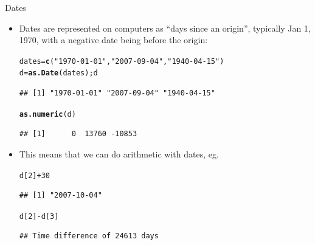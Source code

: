 \documentclass[unknownkeysallowed]{beamer}\usepackage[]{graphicx}\usepackage[]{color}
\makeatletter
\newcommand{\hlnum}[1]{\textcolor[rgb]{0.686,0.059,0.569}{#1}}%
\newcommand{\hlstr}[1]{\textcolor[rgb]{0.192,0.494,0.8}{#1}}%
\newcommand{\hlopt}[1]{\textcolor[rgb]{0,0,0}{#1}}%
\newcommand{\hlstd}[1]{\textcolor[rgb]{0.345,0.345,0.345}{#1}}%
\newcommand{\hlkwb}[1]{\textcolor[rgb]{0.69,0.353,0.396}{#1}}%
\newcommand{\hlkwd}[1]{\textcolor[rgb]{0.737,0.353,0.396}{\textbf{#1}}}%
\newenvironment{kframe}{%
 \def\at@end@of@kframe{}%
 \ifinner\ifhmode%
  \def\at@end@of@kframe{\end{minipage}}%
  \begin{minipage}{\columnwidth}%
 \fi\fi%
 \def\FrameCommand##1{\hskip\@totalleftmargin \hskip-\fboxsep
 \colorbox{shadecolor}{##1}\hskip-\fboxsep
     \hskip-\linewidth \hskip-\@totalleftmargin \hskip\columnwidth}%
 \MakeFramed {\advance\hsize-\width
   \@totalleftmargin\z@ \linewidth\hsize
   \@setminipage}}%
 {\par\unskip\endMakeFramed%
 \at@end@of@kframe}
\newenvironment{knitrout}{}{} %
\makeatother
\begin{document}
\begin{frame}[fragile]{Dates}
  
  \begin{itemize}
  \item Dates are represented on computers as ``days since an
    origin'', typically Jan 1, 1970, with a negative date  being
    before the origin: 
    
\begin{knitrout}
\color{fgcolor}\begin{kframe}
\begin{alltt}
\hlstd{dates}\hlkwb{=}\hlkwd{c}\hlstd{(}\hlstr{"1970-01-01"}\hlstd{,}\hlstr{"2007-09-04"}\hlstd{,}\hlstr{"1940-04-15"}\hlstd{)}
\hlstd{d}\hlkwb{=}\hlkwd{as.Date}\hlstd{(dates) ; d}
\end{alltt}
\begin{verbatim}
## [1] "1970-01-01" "2007-09-04" "1940-04-15"
\end{verbatim}
\begin{alltt}
\hlkwd{as.numeric}\hlstd{(d)}
\end{alltt}
\begin{verbatim}
## [1]      0  13760 -10853
\end{verbatim}
\end{kframe}
\end{knitrout}
\item This means that we can do arithmetic with dates, eg.\
\begin{knitrout}
\color{fgcolor}\begin{kframe}
\begin{alltt}
\hlstd{d[}\hlnum{2}\hlstd{]}\hlopt{+}\hlnum{30}
\end{alltt}
\begin{verbatim}
## [1] "2007-10-04"
\end{verbatim}
\begin{alltt}
\hlstd{d[}\hlnum{2}\hlstd{]}\hlopt{-}\hlstd{d[}\hlnum{3}\hlstd{]}
\end{alltt}
\begin{verbatim}
## Time difference of 24613 days
\end{verbatim}
\end{kframe}
\end{knitrout}
  \end{itemize}
  
\end{frame}
\end{document}
